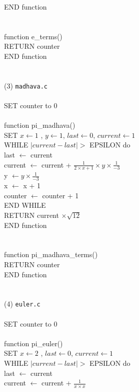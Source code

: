 \documentclass[12pt]{article}
\begin{document}
END function \\
\\
\\
function e\_terms() \\
\indent RETURN counter \\
END function \\
\\
\\
(3) \texttt{madhava.c} \\
\\
SET counter to 0 \\
\\
function pi\_madhava() \\
\indent SET $x \leftarrow 1$ , $y \leftarrow 1$, $last \leftarrow 0$, $current \leftarrow 1$ \\
\indent WHILE $| current - last | >$ EPSILON do \\
\indent \indent last $\leftarrow$ current \\
\indent \indent current $\leftarrow$ current + $\frac{1}{2 \times x + 1} \times y \times \frac{1}{-3}$ \\
\indent \indent y $\leftarrow y \times \frac{1}{-3}$ \\
\indent \indent x $\leftarrow$ x + 1 \\
\indent \indent counter $\leftarrow$ counter + 1 \\
\indent END WHILE \\
\indent RETURN current $\times \sqrt{12}$ \\
END function \\
\\
\\
function pi\_madhava\_terms() \\
\indent RETURN counter \\
END function \\
\\
\\
(4) \texttt{euler.c} \\
\\
SET counter to 0 \\
\\
function pi\_euler() \\
\indent SET $x \leftarrow 2$ , $last \leftarrow 0$, $current \leftarrow 1$ \\
\indent WHILE $| current - last | >$ EPSILON do \\
\indent \indent last $\leftarrow$ current \\
\indent \indent current $\leftarrow$ current + $\frac{1}{x \times x} $ \\
\end{document}
